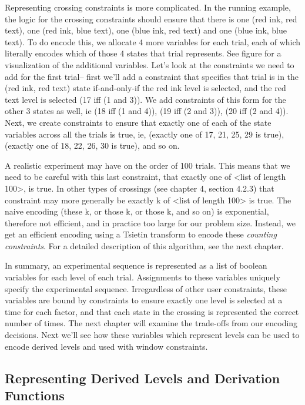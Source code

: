 Representing crossing constraints is more complicated. In the running example, the logic for the crossing constraints should ensure that there is one (red ink, red text), one (red ink, blue text), one (blue ink, red text) and one (blue ink, blue text). To do encode this, we allocate 4 more variables for each trial, each of which literally encodes which of those 4 states that trial represents. See figure  for a visualization of the additional variables. Let's look at the constraints we need to add for the first trial-- first we'll add a constraint that specifies that trial is in the (red ink, red text) state if-and-only-if the red ink level is selected, and the red text level is selected (17 iff (1 and 3)). We add constraints of this form for the other 3 states as well, ie (18 iff (1 and 4)), (19 iff (2 and 3)), (20 iff (2 and 4)). Next, we create constraints to ensure that exactly one of each of the state variables across all the trials is true, ie, (exactly one of 17, 21, 25, 29 is true), (exactly one of 18, 22, 26, 30 is true), and so on.

A realistic experiment may have on the order of 100 trials. This means that we need to be careful with this last constraint, that exactly one of <list of length 100>, is true. In other types of crossings (see chapter 4, section 4.2.3) that constraint may more generally be exactly k of <list of length 100> is true. The naive encoding (these k, or those k, or those k, and so on) is exponential, therefore not efficient, and in practice too large for our problem size. Instead, we get an efficient encoding using a Tsietin transform to encode these \emph{counting constraints}. For a detailed description of this algorithm, see the next chapter.

In summary, an experimental sequence is represented as a list of boolean variables for each level of each trial. Assignments to these variables uniquely specify the experimental sequence. Irregardless of other user constraints, these variables are bound by constraints to ensure exactly one level is selected at a time for each factor, and that each state in the crossing is represented the correct number of times. The next chapter will examine the trade-offs from our encoding decisions. Next we'll see how these variables which represent levels can be used to encode derived levels and used with window constraints.

\subsection{Representing Derived Levels and Derivation Functions}

